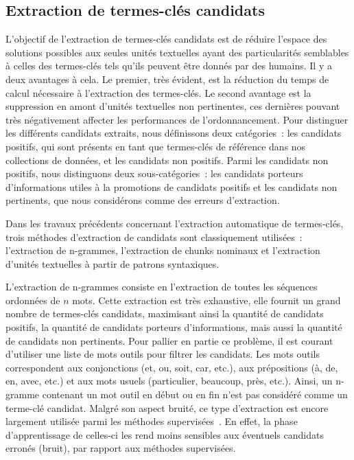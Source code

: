   \subsection{Extraction de termes-clés candidats}
  \label{subsec:extraction_de_termes_cles_candidats}
    L'objectif de l'extraction de termes-clés candidats est de réduire l'espace
    des solutions possibles aux seules unités textuelles ayant des
    particularités semblables à celles des termes-clés tels qu'ils peuvent être
    donnés par des humains. Il y a deux avantages à cela. Le premier, très
    évident, est la réduction du temps de calcul nécessaire à l'extraction des
    termes-clés. Le second avantage est la suppression en amont d'unités
    textuelles non pertinentes, ces dernières pouvant très négativement affecter
    les performances de l'ordonnancement. Pour distinguer les différents
    candidats extraits, nous définissons deux catégories~: les candidats
    positifs, qui sont présents en tant que termes-clés de référence dans nos
    collections de données, et les candidats non positifs. Parmi les candidats
    non positifs, nous distinguons deux sous-catégories~: les candidats porteurs
    d'informations utiles à la promotions de candidats positifs et les candidats
    non pertinents, que nous considérons comme des erreurs d'extraction.

    Dans les travaux précédents concernant l'extraction automatique de
    termes-clés, trois méthodes d'extraction de candidats sont classiquement
    utilisées~: l'extraction de n-grammes, l'extraction de chunks nominaux et
    l'extraction d'unités textuelles à partir de patrons syntaxiques.

    L'extraction de n-grammes consiste en l'extraction de toutes les séquences
    ordonnées de $n$ mots. Cette extraction est très exhaustive, elle fournit
    un grand nombre de termes-clés candidats, maximisant ainsi la quantité de
    candidats positifs, la quantité de candidats porteurs d'informations, mais
    aussi la quantité de candidats non pertinents. Pour pallier en partie ce
    problème, il est courant d'utiliser une liste de mots outils pour filtrer
    les candidats. Les mots outils correspondent aux conjonctions (et, ou, soit,
    car, etc.), aux prépositions (à, de, en, avec, etc.) et aux mots usuels
    (particulier, beaucoup, près, etc.). Ainsi, un n-gramme contenant un mot
    outil en début ou en fin n'est pas considéré comme un terme-clé candidat.
    Malgré son aspect bruité, ce type d'extraction est encore largement utilisée
    parmi les méthodes
    supervisées~\cite{witten1999kea,turney1999learningalgorithms,hulth2003keywordextraction}.
    En effet, la phase d'apprentissage de celles-ci les rend moins sensibles aux
    éventuels candidats erronés (bruit), par rapport aux méthodes supervisées.

